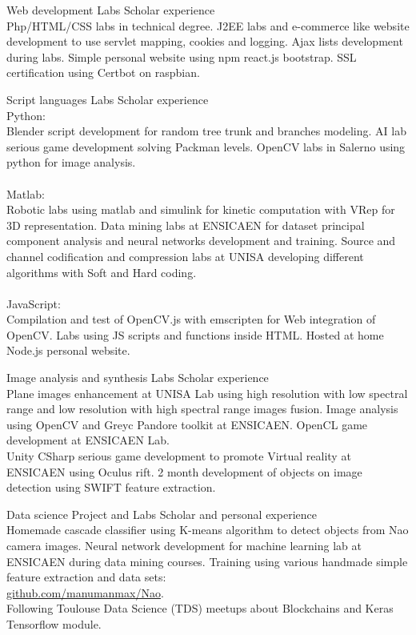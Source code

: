 \documentclass{tccv-master/tccv}
\begin{document}
\begin{eventlist}
\item{Web development}
{Labs}
{Scholar experience}\\
Php/HTML/CSS labs in technical degree.
J2EE labs and e-commerce like website development to use servlet mapping, cookies and logging.
Ajax lists development during labs.
Simple personal website using npm react.js bootstrap.
SSL certification using Certbot on raspbian.

\item{Script languages}
{Labs}
{Scholar experience}\\
Python: \\
Blender script development for random tree trunk and branches modeling. 
AI lab serious game development solving Packman levels.
OpenCV labs in Salerno using python for image analysis.\\\\
Matlab:\\
Robotic labs using matlab and simulink for kinetic computation with VRep for 3D representation.
Data mining labs at ENSICAEN for dataset principal component analysis and neural networks development and training.
Source and channel codification and compression labs at UNISA developing different algorithms with Soft and Hard coding.\\\\
JavaScript:\\
Compilation and test of OpenCV.js with emscripten for Web integration of OpenCV.
Labs using JS scripts and functions inside HTML.
Hosted at home Node.js personal website.

\item
{Image analysis and synthesis}
{Labs}
{Scholar experience}\\
Plane images enhancement at UNISA Lab using high resolution with low spectral range and low resolution with high spectral range images fusion.
Image analysis using OpenCV and Greyc Pandore toolkit at ENSICAEN.
OpenCL game development at ENSICAEN Lab.\\
Unity CSharp serious game development to promote Virtual reality at ENSICAEN using Oculus rift. 2 month development of objects on image detection using SWIFT feature extraction.

\item
{Data science}
{Project and Labs}
{Scholar and personal experience}\\
Homemade cascade classifier using K-means algorithm to detect objects from Nao camera images.
Neural network development for machine learning lab at ENSICAEN during data mining courses.
Training using various handmade simple feature extraction and data sets:\\
\href{https://github.com/manumanmax/Nao}{github.com/manumanmax/Nao}.\\
Following Toulouse Data Science (TDS) meetups about Blockchains and Keras Tensorflow module.


\end{eventlist}
\end{document}
